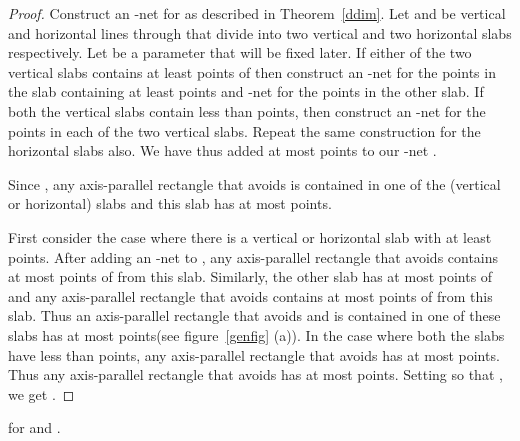 \begin{proof}
Construct an -net  for  as described in 
Theorem~\ref{ddim}. Let  and  be vertical and horizontal lines through  that divide  into two vertical and two horizontal slabs respectively. Let  be a parameter that will be fixed later. If either of the two vertical slabs contains at least  points of
 then construct an -net for the points in the slab containing at least  points
and -net for the points in the other slab. If both the vertical 
slabs contain less than  points, then construct an
-net for the points in each of the two vertical slabs. Repeat the same
construction for the horizontal slabs also. We have thus added at most
 points to our -net .


Since , any
axis-parallel rectangle that avoids  is contained in one of the 
(vertical or horizontal) slabs and this slab has at most  points.

First consider the case where there is a vertical or horizontal slab with at least  points.
 After adding an -net to
,  any axis-parallel rectangle that avoids  contains at most
 points of  from this slab. Similarly,
the other slab has at most  points of  and any
axis-parallel rectangle that avoids  contains at most
 points of  from this slab. Thus an
axis-parallel rectangle that avoids  and is contained in  one of these slabs
has at most  points(see figure~\ref{genfig} (a)). In the
case where both the slabs have less than  points, any
axis-parallel rectangle that avoids  has at most  points. Thus any axis-parallel rectangle that avoids  has at most  points. Setting  so that , we get .
\end{proof}
\begin{thm}\label{grid}
 for  and .
\end{thm}

